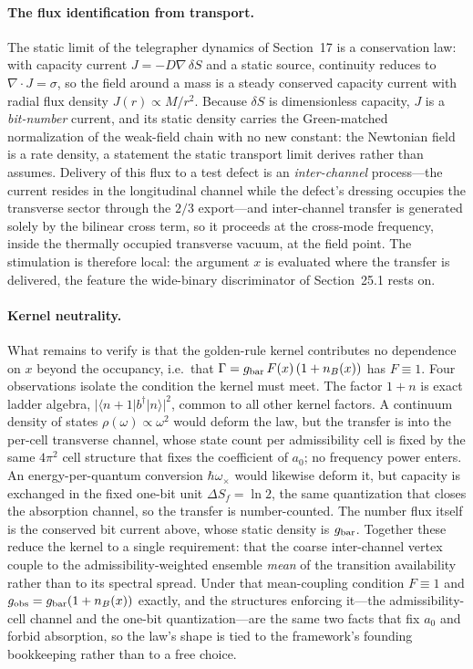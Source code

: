\documentclass[11pt]{article}
\begin{document}
\paragraph{The flux identification from transport.}
The static limit of the telegrapher dynamics of Section~17 is a conservation law: with capacity current $J=-D\nabla\,\delta S$ and a static source, continuity reduces to $\nabla\cdot J=\sigma$, so the field around a mass is a steady conserved capacity current with radial flux density $J(r)\propto M/r^2$. Because $\delta S$ is dimensionless capacity, $J$ is a \emph{bit-number} current, and its static density carries the Green-matched normalization of the weak-field chain with no new constant: the Newtonian field is a rate density, a statement the static transport limit derives rather than assumes. Delivery of this flux to a test defect is an \emph{inter-channel} process---the current resides in the longitudinal channel while the defect's dressing occupies the transverse sector through the $2/3$ export---and inter-channel transfer is generated solely by the bilinear cross term, so it proceeds at the cross-mode frequency, inside the thermally occupied transverse vacuum, at the field point. The stimulation is therefore local: the argument $x$ is evaluated where the transfer is delivered, the feature the wide-binary discriminator of Section~25.1 rests on.

\paragraph{Kernel neutrality.}
What remains to verify is that the golden-rule kernel contributes no dependence on $x$ beyond the occupancy, i.e.\ that $\Gamma=g_{\rm bar}\,F(x)\,(1+n_B(x))$ has $F\equiv1$. Four observations isolate the condition the kernel must meet. The factor $1+n$ is exact ladder algebra, $|\langle n{+}1|b^\dagger|n\rangle|^2$, common to all other kernel factors. A continuum density of states $\rho(\omega)\propto\omega^2$ would deform the law, but the transfer is into the per-cell transverse channel, whose state count per admissibility cell is fixed by the same $4\pi^2$ cell structure that fixes the coefficient of $a_0$; no frequency power enters. An energy-per-quantum conversion $\hbar\omega_\times$ would likewise deform it, but capacity is exchanged in the fixed one-bit unit $\Delta S_f=\ln2$, the same quantization that closes the absorption channel, so the transfer is number-counted. The number flux itself is the conserved bit current above, whose static density is $g_{\rm bar}$. Together these reduce the kernel to a single requirement: that the coarse inter-channel vertex couple to the admissibility-weighted ensemble \emph{mean} of the transition availability rather than to its spectral spread. Under that mean-coupling condition $F\equiv1$ and $g_{\rm obs}=g_{\rm bar}(1+n_B(x))$ exactly, and the structures enforcing it---the admissibility-cell channel and the one-bit quantization---are the same two facts that fix $a_0$ and forbid absorption, so the law's shape is tied to the framework's founding bookkeeping rather than to a free choice.
\end{document}
